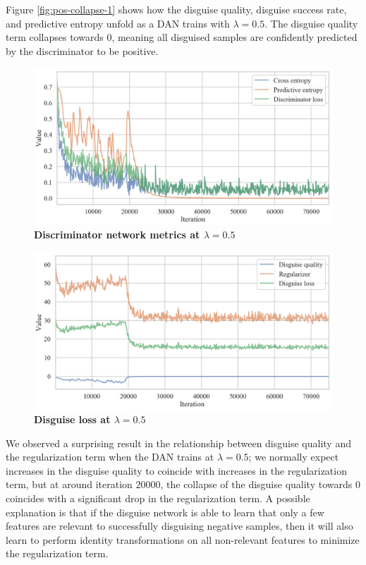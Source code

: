 \documentclass{proc}
\begin{document}
Figure \ref{fig:pos-collapse-1} shows how the disguise quality, disguise success rate, and predictive entropy unfold as a DAN trains with $\lambda = 0.5$. The disguise quality term collapses towards $0$, meaning all disguised samples are confidently predicted by the discriminator to be positive.

\begin{figure}[h!]
		\includegraphics*[scale=0.23]{../figures/pos-collapse-2.png}
		\caption{\textbf{Discriminator network metrics at $\lambda = 0.5$}}
		\label{fig:pos-collapse-2}
\end{figure}

\begin{figure}[h!]
		\includegraphics*[scale=0.23]{../figures/pos-collapse-3.png}
		\caption{\textbf{Disguise loss at $\lambda = 0.5$}}
		\label{fig:pos-collapse-3}
\end{figure}

We observed a surprising result in the relationship between disguise quality and the regularization term when the DAN trains at $\lambda = 0.5$; we normally expect increases in the disguise quality to coincide with increases in the regularization term, but at around iteration $20000$, the collapse of the disguise quality towards $0$ coincides with a significant drop in the regularization term. A possible explanation is that if the disguise network is able to learn that only a few features are relevant to successfully disguising negative samples, then it will also learn to perform identity transformations on all non-relevant features to minimize the regularization term.
\end{document}
